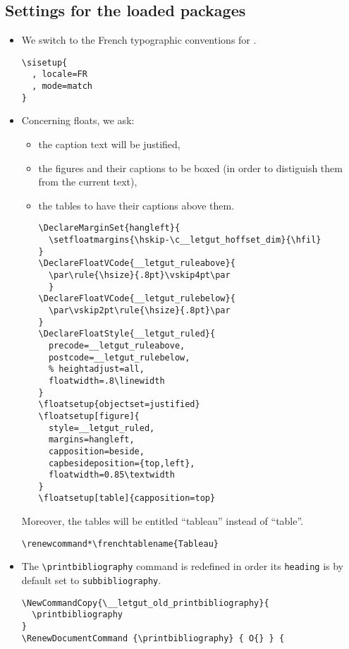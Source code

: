 \documentclass{letgut}
\begin{document}
\subsection{Settings for the loaded packages}
\label{ImplementationSettingsfortheloadedpackages-cdgg55h0jlj0}
\begin{itemize}
\item We switch to the French typographic conventions for .
\begin{lstlisting}
\sisetup{
  , locale=FR
  , mode=match
}
\end{lstlisting}
\item Concerning floats, we ask:
\begin{itemize}
\item the caption text will be justified,
\item the figures and their captions to be boxed (in order to distiguish them from
the current text),
\item the tables to have their captions above them.
\begin{lstlisting}
\DeclareMarginSet{hangleft}{
  \setfloatmargins{\hskip-\c__letgut_hoffset_dim}{\hfil}
}
\DeclareFloatVCode{__letgut_ruleabove}{
  \par\rule{\hsize}{.8pt}\vskip4pt\par
  }
\DeclareFloatVCode{__letgut_rulebelow}{
  \par\vskip2pt\rule{\hsize}{.8pt}\par
}
\DeclareFloatStyle{__letgut_ruled}{
  precode=__letgut_ruleabove,
  postcode=__letgut_rulebelow,
  % heightadjust=all,
  floatwidth=.8\linewidth
}
\floatsetup{objectset=justified}
\floatsetup[figure]{
  style=__letgut_ruled,
  margins=hangleft,
  capposition=beside,
  capbesideposition={top,left},
  floatwidth=0.85\textwidth
}
\floatsetup[table]{capposition=top}
\end{lstlisting}
\end{itemize}
Moreover, the tables will be entitled \enquote{tableau} instead of
\enquote{table}.
\begin{lstlisting}
\renewcommand*\frenchtablename{Tableau}
\end{lstlisting}
\item The \lstinline+\printbibliography+ command is redefined in order its \lstinline+heading+ is by
default set to \lstinline+subbibliography+.
\begin{lstlisting}
\NewCommandCopy{\__letgut_old_printbibliography}{
  \printbibliography
}
\RenewDocumentCommand {\printbibliography} { O{} } {

\end{lstlisting}
\end{itemize}
\end{document}
